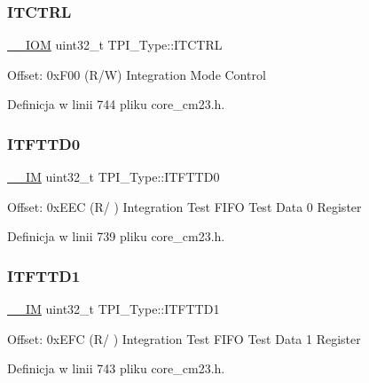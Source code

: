 \subsubsection{\texorpdfstring{I\+T\+C\+T\+RL}{ITCTRL}}
{\footnotesize\ttfamily \hyperlink{core__sc300_8h_ab6caba5853a60a17e8e04499b52bf691}{\+\_\+\+\_\+\+I\+OM} uint32\+\_\+t T\+P\+I\+\_\+\+Type\+::\+I\+T\+C\+T\+RL}

Offset\+: 0x\+F00 (R/W) Integration Mode Control 

Definicja w linii 744 pliku core\+\_\+cm23.\+h.

\mbox{\label{struct_t_p_i___type_a4c53b48c6bb49037c97742136d14b4f7}} 
\subsubsection{\texorpdfstring{I\+T\+F\+T\+T\+D0}{ITFTTD0}}
{\footnotesize\ttfamily \hyperlink{core__sc300_8h_a4cc1649793116d7c2d8afce7a4ffce43}{\+\_\+\+\_\+\+IM} uint32\+\_\+t T\+P\+I\+\_\+\+Type\+::\+I\+T\+F\+T\+T\+D0}

Offset\+: 0x\+E\+EC (R/ ) Integration Test F\+I\+FO Test Data 0 Register 

Definicja w linii 739 pliku core\+\_\+cm23.\+h.

\mbox{\label{struct_t_p_i___type_aaf0447dd4b2c16dc1db1e2172c9dac8f}} 
\subsubsection{\texorpdfstring{I\+T\+F\+T\+T\+D1}{ITFTTD1}}
{\footnotesize\ttfamily \hyperlink{core__sc300_8h_a4cc1649793116d7c2d8afce7a4ffce43}{\+\_\+\+\_\+\+IM} uint32\+\_\+t T\+P\+I\+\_\+\+Type\+::\+I\+T\+F\+T\+T\+D1}

Offset\+: 0x\+E\+FC (R/ ) Integration Test F\+I\+FO Test Data 1 Register 

Definicja w linii 743 pliku core\+\_\+cm23.\+h.

\mbox{\label{struct_t_p_i___type_ae3a3197c7be6ce07b50fd87cbb02f319}} 
